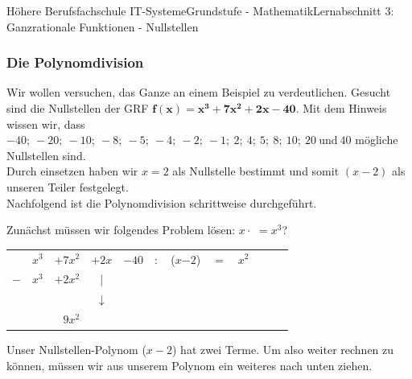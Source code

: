 \documentclass[11pt,twocolumn,oneside,openany,headings=optiontotoc,11pt,numbers=noenddot]{article}
\begin{document}
\begin{worksheet}{Höhere Berufsfachschule IT-Systeme}{Grundstufe - Mathematik}{Lernabschnitt 3: Ganzrationale Funktionen - Nullstellen}
		\subsubsection*{Die Polynomdivision}
		Wir wollen versuchen, das Ganze an einem Beispiel zu verdeutlichen. Gesucht sind die Nullstellen der GRF \(\mathbf{f(x) = x^3+7x^2+2x-40}\). Mit dem Hinweis wissen wir, dass \(\mathit{-40;\ -20;\ -10;\ -8;\ -5;\ -4;\ -2;\ -1;\ 2;\ 4;\ 5;\ 8;\ 10;\ 20}\ \text{und}\ \mathit{40}\) mögliche Nullstellen sind.\\
		Durch einsetzen haben wir \(x=2\) als Nullstelle bestimmt und somit \((x-2)\) als unseren Teiler festgelegt.\\
		Nachfolgend ist die Polynomdivision schrittweise durchgeführt.\\\par\noindent
		Zunächst müssen wir folgendes Problem lösen: \(x\cdot{}\) \( = x^3\)?
		\par\noindent
		\begin{tabularx}{0.5\textwidth}{rlllllllllll}
			& \colorbox{green!10}{\(x^3\)} & \(+\)\(7x^2\) & \(+\)\(2x\) & \(-\)\(40\) & \(:\) & (\colorbox{green!10}{\(x\)}\(-\)\(2\)) & \(=\) & \underline{\(x^2\)} & & & \\
			\(-\) & \colorbox{green!10}{\(x^3\)} & \( +\)\(2x^2\) & \multicolumn{1}{c}{|} & & \multicolumn{5}{l}{\color{codegray}{\small{\textit{\(-[x^2(x-2)] = -[x^3-2x^2] = -x^3 - 2x^2\)}}}}\\
			\cline{1-3}
			& & & \multicolumn{1}{c}{\(\downarrow\)}\\
			& & \multicolumn{1}{r}{\(9x^2\)}
		\end{tabularx}
		\par\noindent
		Unser \grq{}Nullstellen-Polynom\grq{} (\(x-2\)) hat zwei Terme. Um also weiter rechnen zu können, müssen wir aus unserem Polynom ein weiteres nach unten ziehen.
		\begin{framed}
			\noindent
		\end{framed}\normalsize\normalcolor
		\begin{tabularx}{0.5\textwidth}{rlllllllllll}

\end{tabularx}
\end{worksheet}
\end{document}
